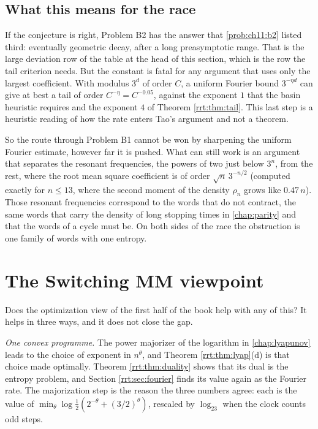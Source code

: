 \subsection{What this means for the race}
If the conjecture is right, Problem B2 has the answer that \cref{prob:ch11:b2} listed third: eventually geometric decay, after a long preasymptotic range. That is the large deviation row of the table at the head of this section, which is the row the tail criterion needs. But the constant is fatal for any argument that uses only the largest coefficient. With modulus $3^d$ of order $C$, a uniform Fourier bound $3^{-\eta d}$ can give at best a tail of order $C^{-\eta}=C^{-0.05}$, against the exponent $1$ that the basin heuristic requires and the exponent $4$ of Theorem \ref{rrt:thm:tail}. This last step is a heuristic reading of how the rate enters Tao's argument and not a theorem.

So the route through Problem B1 cannot be won by sharpening the uniform Fourier estimate, however far it is pushed. What can still work is an argument that separates the resonant frequencies, the powers of two just below $3^n$, from the rest, where the root mean square coefficient is of order $\sqrt n\,3^{-n/2}$ (computed exactly for $n\le13$, where the second moment of the density $\rho_n$ grows like $0.47\,n$). Those resonant frequencies correspond to the words that do not contract, the same words that carry the density of long stopping times in \cref{chap:parity} and that the words of a cycle must be. On both sides of the race the obstruction is one family of words with one entropy.

\section{The Switching MM viewpoint}\label{rrt:sec:smm}

Does the optimization view of the first half of the book help with any of this? It helps in three ways, and it does not close the gap.

\emph{One convex programme.} The power majorizer of the logarithm in \cref{chap:lyapunov} leads to the choice of exponent in $n^{\theta}$, and Theorem \ref{rrt:thm:lyap}(d) is that choice made optimally. Theorem \ref{rrt:thm:duality} shows that its dual is the entropy problem, and Section \ref{rrt:sec:fourier} finds its value again as the Fourier rate. The majorization step is the reason the three numbers agree: each is the value of $\min_\theta\log\tfrac12(2^{-\theta}+(3/2)^{\theta})$, rescaled by $\log_23$ when the clock counts odd steps.

